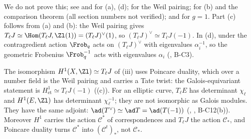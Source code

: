 We do not prove this; see \cite[Sections 16 and 19]{MilneAbelian86} and \cite{MilneJacobian86} for (a), (d); \cite[Section 20]{Mumford70} for the Weil pairing; \cite{MilneEtale}
for (b) and the comparison theorem (all section numbers not verified); and \cite[Chapter III, Section 8, and Chapter V, Section 2]{SilvermanAEC} for $g=1$. Part (c) follows from
(a) and (b): the Weil pairing gives $T_\ell J\simeq\Hom(T_\ell J,\Zl(1))=(T_\ell J)^\vee(1)$, so $(T_\ell J)^\vee\simeq T_\ell J(-1)$. In (d), under the contragredient action $\Frob_q$ acts on
$(T_\ell J)^\vee$ with eigenvalues $\alpha_i^{-1}$, so the geometric Frobenius $\Frob_q^{-1}$ acts with eigenvalues $\alpha_i$ (, B-C3).

\begin{warning}\label{warn:curves:not-galois}
The isomorphism $H^1(X,\Zl)\simeq T_\ell J$ of (iii) uses Poincare duality, which over a number field is the Weil pairing and carries a Tate twist:
the Galois-equivariant statement is $H^1_{\mathrm{et}}\simeq T_\ell J(-1)$ ((c)). For an elliptic curve, $T_\ell E$ has determinant $\chi_\ell$ and
$H^1(E,\Zl)$ has determinant $\chi_\ell^{-1}$; they are not isomorphic as Galois modules. They have the same adjoint: $\ad(T^\vee)\simeq\ad T=\ad(T(-1))$ (,
, B-C12(b)). Moreover $H^1$ carries the action $\mathcal C^*$ of correspondences and $T_\ell J$ the action $\mathcal C_*$, and Poincare duality turns $\mathcal C^*$ into
$(\mathcal C^t)_*$, not $\mathcal C_*$.
\end{warning}

